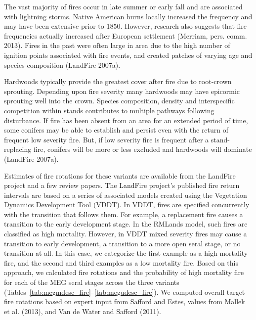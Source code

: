 The vast majority of fires occur in late summer or early fall and are associated with lightning storms. Native American burns locally increased the frequency and may have been extensive prior to 1850. However, research also suggests that fire frequencies actually increased after European settlement (Merriam, pers. comm. 2013). Fires in the past were often large in area due to the high number of ignition points associated with fire events, and created patches of varying age and species composition (LandFire 2007a). 

Hardwoods typically provide the greatest cover after fire due to root-crown sprouting. Depending upon fire severity many hardwoods may have epicormic sprouting well into the crown. Species composition, density and interspecific competition within stands contributes to multiple pathways following disturbance. If fire has been absent from an area for an extended period of time, some conifers may be able to establish and persist even with the return of frequent low severity fire. But, if low severity fire is frequent after a stand-replacing fire, conifers will be more or less excluded and hardwoods will dominate (LandFire 2007a).

Estimates of fire rotations for these variants are available from the LandFire project and a few review papers. The LandFire project’s published fire return intervals are based on a series of associated models created using the Vegetation Dynamics Development Tool (VDDT). In VDDT, fires are specified concurrently with the transition that follows them. For example, a replacement fire causes a transition to the early development stage. In the RMLands model, such fires are classified as high mortality. However, in VDDT mixed severity fires may cause a transition to early development, a transition to a more open seral stage, or no transition at all. In this case, we categorize the first example as a high mortality fire, and the second and third examples as a low mortality fire. Based on this approach, we calculated fire rotations and the probability of high mortality fire for each of the MEG seral stages across the three variants (Tables~\ref{tab:megmdesc_fire}--\ref{tab:megudesc_fire}). We computed overall target fire rotations based on expert input from Safford and Estes, values from Mallek et al. (2013), and Van de Water and Safford (2011). 

